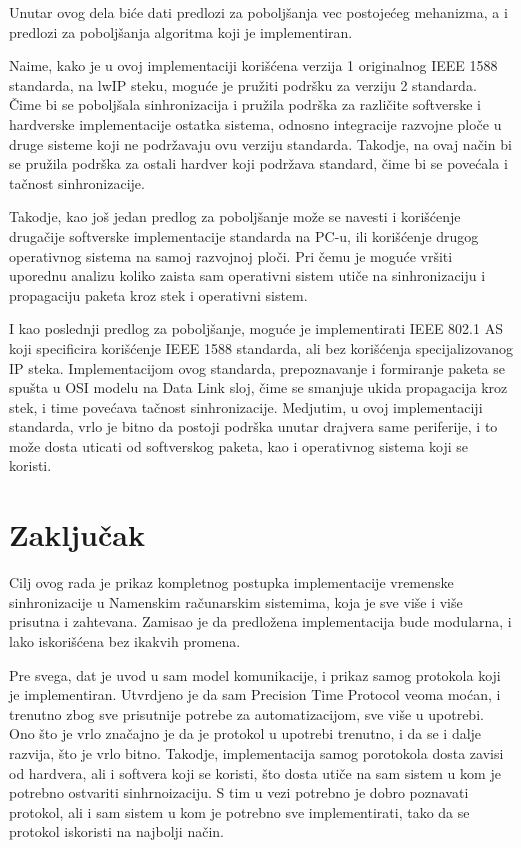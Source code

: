 \documentclass[a4paper,12pt, master]{etf}
\begin{document}
	Unutar ovog dela bi\'{c}e dati predlozi za pobolj\v{s}anja vec
	postoje\'{c}eg mehanizma, a i predlozi za pobolj\v{s}anja algoritma koji je
	implementiran.

	Naime, kako je u ovoj implementaciji kori\v{s}\'{c}ena verzija 1
	originalnog IEEE 1588 standarda, na lwIP steku, mogu\'{c}e je pru\v{z}iti
	podr\v{s}ku za verziju 2 standarda. \v{C}ime bi se pobolj\v{s}ala
	sinhronizacija i pru\v{z}ila podr\v{s}ka za razli\v{c}ite softverske i
	hardverske implementacije ostatka sistema, odnosno integracije razvojne
	plo\v{c}e u druge sisteme koji ne podr\v{z}avaju ovu verziju standarda.
	Takodje, na ovaj na\v{c}in bi se pru\v{z}ila podr\v{s}ka za ostali hardver
	koji podr\v{z}ava standard, \v{c}ime bi se pove\'{c}ala i ta\v{c}nost
	sinhronizacije.

	Takodje, kao jo\v{s} jedan predlog za pobolj\v{s}anje mo\v{z}e se navesti i
	kori\v{s}\'{c}enje druga\v{c}ije softverske implementacije standarda na
	PC-u, ili kori\v{s}\'{c}enje drugog operativnog sistema na samoj razvojnoj
	plo\v{c}i. Pri \v{c}emu je mogu\'{c}e vr\v{s}iti uporednu analizu koliko
	zaista sam operativni sistem uti\v{c}e na sinhronizaciju i propagaciju
	paketa kroz stek i operativni sistem.

	I kao poslednji predlog za pobolj\v{s}anje, mogu\'{c}e je implementirati
	IEEE 802.1 AS koji specificira kori\v{s}\'{c}enje IEEE 1588 standarda, ali
	bez kori\v{s}\'{c}enja specijalizovanog IP steka. Implementacijom ovog
	standarda, prepoznavanje i formiranje paketa se spu\v{s}ta u OSI modelu na
	Data Link sloj, \v{c}ime se smanjuje ukida propagacija kroz stek, i time
	pove\'{c}ava ta\v{c}nost sinhronizacije. Medjutim, u ovoj implementaciji
	standarda, vrlo je bitno da postoji podr\v{s}ka unutar drajvera same
	periferije, i to mo\v{z}e dosta uticati od softverskog paketa, kao i
	operativnog sistema koji se koristi.

	\newpage

	\chapter{Zaključak}

	Cilj ovog rada je prikaz kompletnog postupka implementacije vremenske 
	sinhronizacije u Namenskim ra\v{c}unarskim sistemima, koja je sve vi\v{s}e 
	i vi\v{s}e prisutna i zahtevana. Zamisao je da predlo\v{z}ena 
	implementacija bude modularna, i lako iskori\v{s}\'{c}ena bez ikakvih 
	promena.

	Pre svega, dat je uvod u sam model komunikacije, i prikaz samog protokola 
	koji je implementiran. Utvrdjeno je da sam Precision Time Protocol veoma 
	mo\'{c}an, i trenutno zbog sve prisutnije potrebe za automatizacijom, sve 
	vi\v{s}e u upotrebi. Ono \v{s}to je vrlo zna\v{c}ajno je da je protokol u 
	upotrebi trenutno, i da se i dalje razvija, \v{s}to je vrlo bitno. Takodje, 
	implementacija samog porotokola dosta zavisi od hardvera, ali i softvera 
	koji se koristi, \v{s}to dosta uti\v{c}e na sam sistem u kom je potrebno 
	ostvariti sinhrnoizaciju. S tim u vezi potrebno je dobro poznavati protokol,
	 ali i sam sistem u kom je potrebno sve implementirati, tako da se protokol 
	iskoristi na najbolji na\v{c}in.
\end{document}
